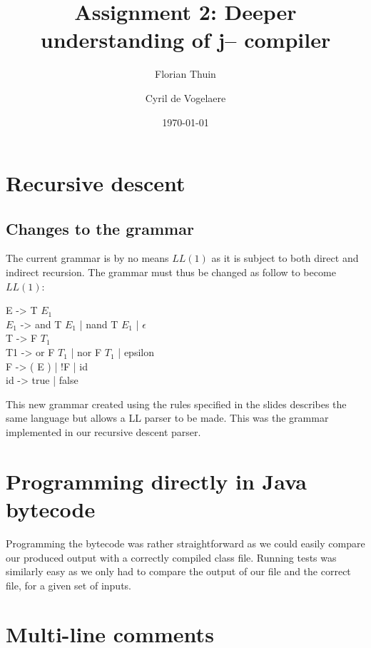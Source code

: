 \documentclass[a4paper, 11pt]{article}
\author{Florian Thuin \and Cyril de Vogelaere}
\date{\today}
\title{Assignment 2: Deeper understanding of j-- compiler}
\begin{document}
    \maketitle
    \tableofcontents

    \section{Recursive descent}
    \subsection{Changes to the grammar}

    	The current grammar is by no means $LL(1)$ as it is subject to both direct and
    	indirect recursion. The grammar must thus be changed as follow to become $LL(1)$:
    	\newline

    	\begin{flushleft}
    	E -> T $E_1$ \\
    	$E_1$ -> and T $E_1$ | nand T $E_1$ | $\epsilon$ \\
    	T -> F $T_1$ \\
		T1 -> or F $T_1$ | nor F $T_1$ | epsilon \\
		F -> ( E ) | !F | id \\
		id -> true | false \\
		\end{flushleft}

    	This new grammar created using the rules specified in the slides describes
    	the same language but allows a LL parser to be made. This was the grammar
    	implemented in our recursive descent parser.

    \section{Programming directly in Java bytecode}
    
    	Programming the bytecode was rather straightforward as we could easily compare
    	our produced output with a correctly compiled class file. Running tests was similarly
    	easy as we only had to compare the output of our file and the correct file, for a 
    	given set of inputs.
    	
    \section{Multi-line comments}
\end{document}
